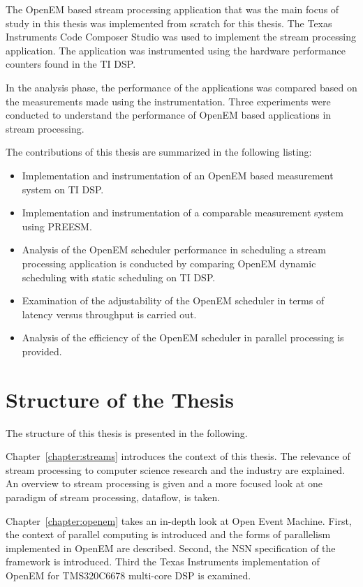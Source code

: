 The OpenEM based stream processing application that was the main focus of study in this thesis was implemented from scratch for this thesis. The Texas Instruments Code Composer Studio was used to implement the stream processing application. The application was instrumented using the hardware performance counters found in the TI DSP.

In the analysis phase, the performance of the applications was compared based on the measurements made using the instrumentation. Three experiments were conducted to understand the performance of OpenEM based applications in stream processing.

The contributions of this thesis are summarized in the following listing:
\begin{itemize}
    \item Implementation and instrumentation of an OpenEM based measurement system on TI DSP.
    \item Implementation and instrumentation of a comparable measurement system using PREESM.
    \item Analysis of the OpenEM scheduler performance in scheduling a stream processing application is conducted by comparing OpenEM dynamic scheduling with static scheduling on TI DSP.
    \item Examination of the adjustability of the OpenEM scheduler in terms of latency versus throughput is carried out.
    \item Analysis of the efficiency of the OpenEM scheduler in parallel processing is provided.
\end{itemize}

\section{Structure of the Thesis}
\label{section:structure}
The structure of this thesis is presented in the following.

Chapter~\ref{chapter:streams} introduces the context of this thesis. The relevance of stream processing to computer science research and the industry are explained. An overview to stream processing is given and a more focused look at one paradigm of stream processing, dataflow, is taken.

Chapter~\ref{chapter:openem} takes an in-depth look at Open Event Machine. First, the context of parallel computing is introduced and the forms of parallelism implemented in OpenEM are described. Second, the NSN specification of the framework is introduced. Third the Texas Instruments implementation of OpenEM for TMS320C6678 multi-core DSP is examined.

